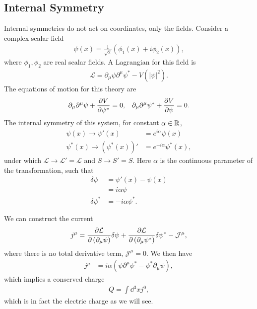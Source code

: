 
\subsection{Internal Symmetry}


\begin{example}
    Internal symmetries do not act on coordinates, only the fields. Consider a complex scalar field
    \begin{align}
        \psi \left( x \right) = \frac{1}{\sqrt{2} } \left( \phi_{1} \left( x \right) + i \phi_2 \left( x \right)  \right) 
    ,\end{align}
    where $\phi_1 ,\phi_2$ are real scalar fields. A Lagrangian for this field is
    \begin{align}
        \mathcal{L} = \partial_\mu \psi \partial^{\mu} \psi^{*} - V \left( \left| \psi \right|^2 \right) 
    .\end{align}
    The equations of motion for this theory are
    \begin{align}
        \partial_\mu \partial^{\mu} \psi + \pdv{V}{\psi^{*}} = 0, && \partial_\mu \partial^{\mu} \psi^{*} + \pdv{V}{\psi} = 0
    .\end{align}
    The internal symmetry of this system, for constant $\alpha \in \mathbb{R}$,
    \begin{align}
        \psi \left( x \right) \to \psi' \left( x \right) &= e^{i \alpha} \psi \left( x \right) \label{eq:global_phase}  \\
        \psi^{*} \left( x \right) \to \left( \psi^{*} \left( x \right)  \right)' &= e^{-i\alpha} \psi^{*} \left( x \right) 
    ,\end{align}
    under which $\mathcal{L} \to \mathcal{L}' = \mathcal{L}$ and $S \to S' = S$. Here $\alpha$ is the continuous parameter of the transformation, such that
    \begin{align}
        \delta \psi &= \psi' \left( x \right) - \psi \left( x \right)  \\
        &= i \alpha \psi \\
        \delta \psi^{*} &= -i \alpha \psi^{*}
    .\end{align}

    We can construct the current
    \begin{align}
        j^{\mu} = \pdv{\mathcal{L}}{\left( \partial_\mu \psi \right) } \delta \psi + \pdv{\mathcal{L}}{\left( \partial_\mu \psi^{*} \right) } \delta \psi^{*} - \mathcal{J}^{\mu}
    ,\end{align}
    where there is no total derivative term, $\mathcal{J}^{\mu} = 0$. We then have
    \begin{align}
        j^{\mu} &= i \alpha \left( \psi \partial^{\mu} \psi^{*} - \psi^{*} \partial_\mu \psi \right) 
    ,\end{align}
    which implies a conserved charge
    \begin{align}
        Q = \int \dd{^3x} j^{0}
    ,\end{align}
    which is in fact the electric charge as we will see.


\end{example}
